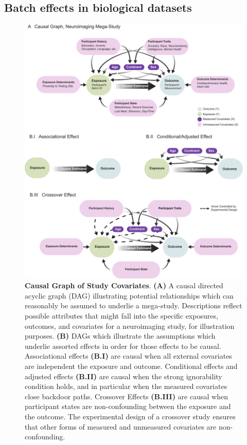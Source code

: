 \subsection{Batch effects in biological datasets}

\begin{figure}[h]
    \centering \includegraphics[width=\linewidth]{Figures/Content/CoRR_dag.pdf}
    \caption{\textbf{Causal Graph of Study Covariates}. \textbf{(A)} A causal directed acyclic graph (DAG) illustrating potential relationships which can reasonably be assumed to underlie a mega-study. Descriptions reflect possible attributes that might fall into the specific exposures, outcomes, and covariates for a neuroimaging study, for illustration purposes. \textbf{(B)} DAGs which illustrate the assumptions which underlie assorted effects in order for those effects to be causal. Associational effects \textbf{(B.I)} are causal when all external covariates are independent the exposure and outcome. Conditional effects and adjusted effects \textbf{(B.II)} are causal when the strong ignorability condition holds, and in particular when the measured covariates close backdoor paths. Crossover Effects \textbf{(B.III)} are causal when participant states are non-confounding between the exposure and the outcome. The experimental design of a crossover study ensures that other forms of measured and unmeasured covariates are non-confounding.}
    \label{fig:dag}
\end{figure}

